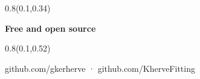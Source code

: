 \documentclass[aspectratio=169]{beamer}
\begin{document}
\begin{frame}[t]

\begin{textblock}{0.8}(0.1,0.34)
{\centering\fontsize{32}{38}\selectfont \textcolor[HTML]{003E74}{\textbf{Free and open source}}\par}
\end{textblock}

\begin{textblock}{0.8}(0.1,0.52)
{\centering\fontsize{16}{19}\selectfont \textcolor[HTML]{0091D4}{github.com/gkerherve  ·  github.com/KherveFitting}\par}
\end{textblock}
\end{frame}
\end{document}
